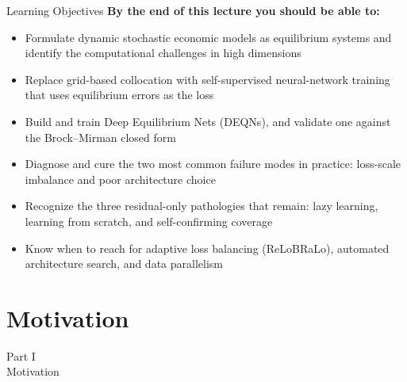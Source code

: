 \documentclass[aspectratio=169,11pt]{beamer}
\newcommand{\emphc}[1]{\textcolor{harvardcrimson}{#1}}
\begin{document}
\begin{frame}{Learning Objectives}
\textbf{By the end of this lecture you should be able to:}
\begin{itemize}\itemsep3pt
  \item Formulate dynamic stochastic economic models as equilibrium systems and identify the computational challenges in high dimensions
  \item Replace grid-based collocation with \emphc{self-supervised} neural-network training that uses equilibrium errors as the loss
  \item Build and train Deep Equilibrium Nets (DEQNs), and validate one against the Brock--Mirman closed form
  \item Diagnose and cure the two most common failure modes in practice: \emphc{loss-scale imbalance} and \emphc{poor architecture choice}
  \item Recognize the three residual-only pathologies that remain: lazy learning, learning from scratch, and self-confirming coverage
  \item Know when to reach for adaptive loss balancing (ReLoBRaLo), automated architecture search, and data parallelism
\end{itemize}
\end{frame}


\section{Motivation}

\begin{frame}{}
\begin{center}
{\Huge \textcolor{uzhblue}{Part I}}\\[0.8em]
{\LARGE Motivation}
\end{center}
\end{frame}
\end{document}
